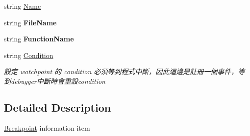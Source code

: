 \begin{DoxyCompactItemize}
\item 
string \hyperlink{classlib_wather_debugger_1_1_breakpoint_1_1_debug_breakpoint_a4d64af3bc9dab8958c05a456023f4d04}{Name}
\item 
\hypertarget{classlib_wather_debugger_1_1_breakpoint_1_1_debug_breakpoint_a0f4bdb42992c4d713258309187880910}{string {\bfseries File\+Name}}\label{classlib_wather_debugger_1_1_breakpoint_1_1_debug_breakpoint_a0f4bdb42992c4d713258309187880910}

\item 
\hypertarget{classlib_wather_debugger_1_1_breakpoint_1_1_debug_breakpoint_ae012d51d54fa8e54d096c99b63998a00}{string {\bfseries Function\+Name}}\label{classlib_wather_debugger_1_1_breakpoint_1_1_debug_breakpoint_ae012d51d54fa8e54d096c99b63998a00}

\item 
string \hyperlink{classlib_wather_debugger_1_1_breakpoint_1_1_debug_breakpoint_a0d15306b4bb449b26349a5157f09e56c}{Condition}
\begin{DoxyCompactList}\small\item\em 設定 watchpoint 的 condition 必須等到程式中斷，因此這邊是註冊一個事件，等到debugger中斷時會重設condition \end{DoxyCompactList}\end{DoxyCompactItemize}


\subsection{Detailed Description}
\hyperlink{namespacelib_wather_debugger_1_1_breakpoint}{Breakpoint} information item 



